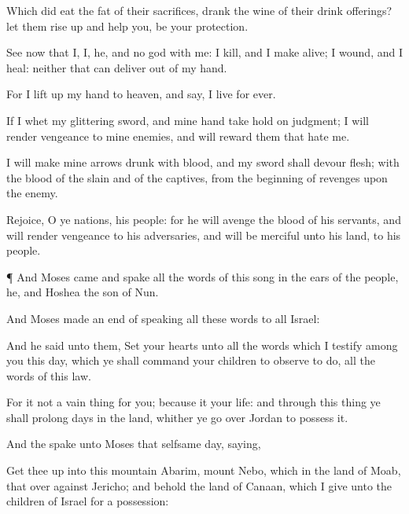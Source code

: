 {Which did
eat the
fat of their
sacrifices,
{}
drank the
wine of their drink
offerings? let them rise
up and
help you,
{} be your
protection.


\par }{\PP {}See now that I,
{} I,
{} he, and
{} no
god with me: I
kill, and I make
alive; I
wound, and I
heal: neither
{} that can
deliver out of my
hand.

For I lift
up my
hand to
heaven, and
say, I
live for
ever.

If I
whet my
glittering
sword, and mine
hand take
hold on
judgment; I will
render
vengeance to mine
enemies, and will
reward them that
hate me.

I will make mine
arrows
drunk with
blood, and my
sword shall
devour
flesh;
{} with the
blood of the
slain and of the
captives, from the
beginning of
revenges upon the
enemy.

Rejoice, O ye
nations,
{} his
people: for he will
avenge the
blood of his
servants, and will
render
vengeance to his
adversaries, and will be
merciful unto his
land,
{} to his
people.


\par }{\PP {}¶ And
Moses
came and
spake all the
words of this
song in the
ears of the
people, he, and
Hoshea the
son of
Nun.

And
Moses made an
end of
speaking all these
words to all
Israel:

And he
said unto them,
Set your
hearts unto all the
words which I
testify among you this
day, which ye shall
command your
children to
observe to
do, all the
words of this
law.

For it
{} not a
vain
thing for you; because it
{} your
life: and through this
thing ye shall
prolong
{}
days in the
land, whither ye go
over
Jordan to
possess it.

And the
{}
spake unto
Moses that
selfsame
day,
saying,

Get thee
up into this
mountain
Abarim,
{}
mount
Nebo, which
{} in the
land of
Moab, that
{} over
against
Jericho; and
behold the
land of
Canaan, which I
give unto the
children of
Israel for a
possession:

}
